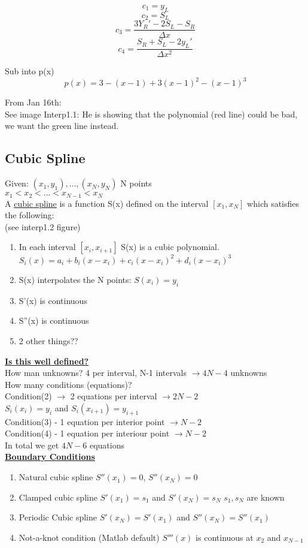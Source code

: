 \documentclass[12pt]{article}
\newcommand{\myt}[1]{\textbf{\underline{#1}}}
\begin{document}
	$$c_1 = y_L$$
	$$c_2 = S_L$$
	$$c_3 = \frac{3Y_R' - 2S_L - S_R}{\Delta x}$$
	$$c_4 = \frac{S_R + S_L - 2y_L'}{\Delta x^2}$$
	
	Sub into p(x)\\
	$$p(x) = 3 - (x-1) + 3(x-1)^2 - (x-1)^3$$
	
	From Jan 16th:\\
	See image Interp1.1: He is showing that the polynomial (red line) could be bad, we want the green line instead.\\
	
	\subsection*{Cubic Spline}
	Given: $(x_1,y_1),...,(x_N,y_N)$ N points\\
	$x_1 < x_2 < ... < x_{N-1} < x_{N}$\\
	
	A \underline{cubic spline} is a function S(x) defined on the interval $[x_1, x_N]$ which satisfies the following:\\
	(see interp1.2 figure)
	\begin{enumerate}
		\item In each interval $[x_i,x_{i+1}]$ S(x) is a cubic polynomial. $S_i(x) = a_i + b_i(x-x_i) + c_i(x-x_i)^2 + d_i(x-x_i)^3$
		\item S(x) interpolates the N points: $S(x_i) = y_i$
		\item S'(x) is continuous
		\item S''(x) is continuous
		\item 2 other things??
	\end{enumerate}
	\myt{Is this well defined?}\\
	How man unknowns? 4 per interval, N-1 intervals $\rightarrow 4N-4$ unknowns\\
	How many conditions (equations)?\\
	Condition(2) $\rightarrow$ 2 equations per interval $\rightarrow 2N-2$\\
	$S_i(x_i) = y_i$ and $S_i(x_{i+1}) = y_{i+1}$\\
	Condition(3) - 1 equation per interior point $\rightarrow N-2$\\
	Condition(4) - 1 equation per interiour point $\rightarrow N-2$\\
	In total we get $4N-6$ equations\\
	
	\myt{Boundary Conditions}
	\begin{enumerate}
		\item Natural cubic spline $S''(x_1) = 0$, $S''(x_N) = 0$
		\item Clamped cubic spline $S'(x_1) = s_1$ and $S'(x_N) = s_N$ $s_1, s_N$ are known
		\item Periodic Cubic spline $S'(x_N) = S'(x_1)$ and $S''(x_N) = S''(x_1)$
		\item Not-a-knot condition (Matlab default) $S'''(x)$ is continuous at $x_2$ and $x_{N-1}$
	\end{enumerate}
\end{document}
